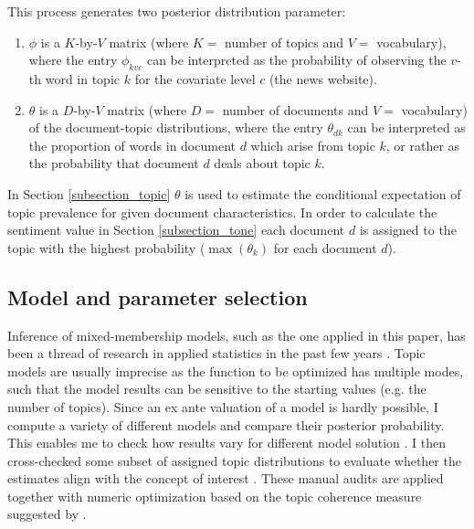 \documentclass[12pt,a4paper,notitlepage]{article}
\begin{document}
This process generates two posterior distribution parameter: 

\begin{enumerate}
	\item $\phi$ is a $K$-by-$V$ matrix (where $K=$ number of topics and $V=$ vocabulary), where the entry $\phi_{kvc}$ can be interpreted as the probability of observing the $v$-th word in topic $k$ for the covariate level $c$ (the news website). 
	\item $\theta$ is a $D$-by-$V$ matrix (where $D=$ number of documents and $V=$ vocabulary) of the document-topic distributions, where the entry $\theta_{dk}$ can be interpreted as the proportion of words in document $d$ which arise from topic $k$, or rather as the probability that document $d$ deals about topic $k$. 
\end{enumerate}

In Section \ref{subsection_topic} $\theta$ is used to estimate the conditional expectation of topic prevalence for given document characteristics. In order to calculate the sentiment value in Section \ref{subsection_tone} each document $d$ is assigned to the topic with the highest probability ($\max (\theta_{k})$ for each document $d$).

\subsection{Model and parameter selection}

Inference of mixed-membership models, such as the one applied in this paper, has been a thread of research in applied statistics in the past few years \citep{blei_latent_2003} \citep{erosheva_mixed-membership_2004} \citep{braun_variational_2010}. Topic models are usually imprecise as the function to be optimized has multiple modes, such that the model results can be sensitive to the starting values (e.g. the number of topics). Since an ex ante valuation of a model is hardly possible, I compute a variety of different models and compare their posterior probability. This enables me to check how results vary for different model solution \citep{roberts_navigating_2016}. I then cross-checked some subset of assigned topic distributions to evaluate whether the estimates align with the concept of interest \citep{gentzkow_text_2017}. These manual audits are applied together with numeric optimization based on the topic coherence measure suggested by \citet{mimno_optimizing_2011}. 
\end{document}
